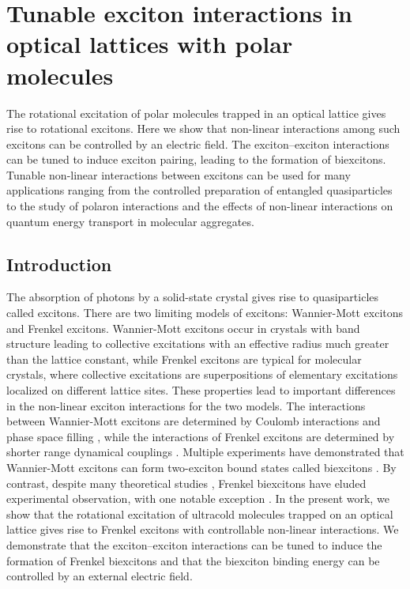 
\chapter{Tunable exciton interactions in optical lattices with polar molecules}
\label{ch:biexciton}

The rotational excitation of polar molecules trapped in an optical lattice gives rise to rotational excitons. Here we show
 that non-linear interactions among such excitons can be controlled by an electric field. The exciton--exciton interactions
 can be tuned to induce exciton pairing, leading to the formation of biexcitons. Tunable non-linear interactions
 between excitons can be used for many applications ranging from the controlled preparation of entangled
 quasiparticles to the study of polaron interactions and the effects of non-linear interactions on quantum energy
 transport in molecular aggregates. 


\section{ Introduction}  
The absorption of photons by a solid-state crystal gives rise to quasiparticles called excitons. There are two limiting
 models of excitons: Wannier-Mott excitons and Frenkel excitons. Wannier-Mott excitons occur in crystals with band
 structure leading to collective excitations with an effective radius much greater than the lattice constant, while
 Frenkel excitons are typical for molecular crystals, where collective excitations are superpositions of elementary
 excitations localized on different lattice sites. These properties lead to important differences in the non-linear exciton
 interactions for the two models. The interactions between  Wannier-Mott excitons are determined by 
 Coulomb interactions and phase space filling \cite{nolinear-wannier, nolinear-wannier2}, while the interactions of
 Frenkel excitons are determined by shorter range dynamical couplings \cite{agranovich}. Multiple experiments
 have demonstrated that Wannier-Mott excitons can form two-exciton bound states called biexcitons \cite{wmxx, wmxx2,
 wmxx3, wmxx4, wmxx5, stevenson2006, Lozovik2002}. By contrast, despite many theoretical studies 
 \cite{vektaris, Ezaki1994, biexciton-theory-1,biexciton-theory-2}, Frenkel biexcitons have eluded  experimental
 observation, with one notable exception \cite{frenkelxx, frenkelxx2}. In the present work, we show that the rotational
 excitation of ultracold molecules trapped on an optical lattice gives rise to Frenkel excitons with controllable 
non-linear interactions. We demonstrate that the exciton--exciton interactions can be tuned to induce the formation
 of Frenkel biexcitons and that the biexciton binding energy can be controlled by an external electric field.    

